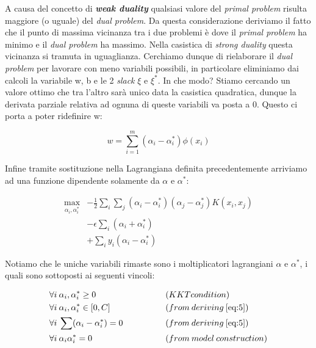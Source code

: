 \documentclass[12pt]{article}
\begin{document}
	A causa del concetto di \textbf{\textit{weak duality}} qualsiasi valore del \textit{primal problem} risulta maggiore (o uguale) del \textit{dual problem}. Da questa considerazione deriviamo il fatto che il punto di massima vicinanza tra i due problemi è dove il \textit{primal problem} ha minimo e il \textit{dual problem} ha massimo. Nella casistica di \textit{strong duality} questa vicinanza si tramuta in uguaglianza.
Cerchiamo dunque di rielaborare il \textit{dual problem} per lavorare con meno variabili possibili, in particolare eliminiamo dai calcoli la variabile w, b e le 2 \textit{slack} $\xi$ e $\xi^*$. In che modo? Stiamo cercando un valore ottimo che tra l’altro sarà unico data la casistica quadratica, dunque la derivata parziale relativa ad ognuna di queste variabili va posta a 0. Questo ci porta a poter ridefinire w:

	\begin{equation}\label{eq:4}
		w = \sum_{i=1}^{m}(\alpha_i - \alpha_i^*)\phi(x_i)
	\end{equation}

	Infine tramite sostituzione nella Lagrangiana definita precedentemente arriviamo ad una funzione dipendente solamente da $\alpha$ e $\alpha^*$:

	\begin{equation}\label{eq:5}
	\begin{aligned}
		\max_{\alpha_i,\alpha_i^*} &- \frac{1}{2}\sum_i\sum_j(\alpha_i - \alpha_i^*)(\alpha_j - \alpha_j^*)K(x_i,x_j) \\
		&- \epsilon\sum_i(\alpha_i + \alpha_i^*)\\
		&+ \sum_i y_i(\alpha_i - \alpha_i^*)
	\end{aligned}
	\end{equation}

	Notiamo che le uniche variabili rimaste sono i moltiplicatori lagrangiani $\alpha$ e $\alpha^*$, i quali sono sottoposti ai seguenti vincoli:
	
	\begin{equation}\label{eq:6}
		\begin{aligned}
		&\forall i \: \alpha_i,\alpha_i^* \geq 0 \qquad\qquad &&(KKT condition) \\
		&\forall i \: \alpha_i,\alpha_i^* \in [0,C]  \qquad\qquad &&(from \: deriving \: \eqref{eq:5})\\
		&\forall i \: \sum (\alpha_i - \alpha_i^*) = 0 \qquad\qquad &&(from \: deriving \: \eqref{eq:5})\\
		&\forall i \: \alpha_i \alpha_i^* = 0 \qquad\qquad &&(from \: model \: construction)
		\end{aligned}
	\end{equation}
			
\end{document}
